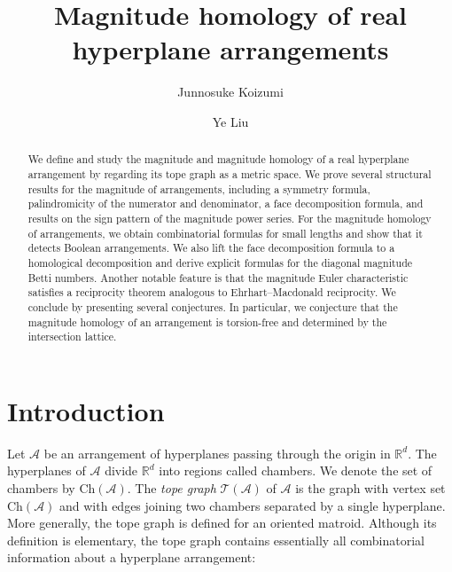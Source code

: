 \documentclass{amsart}
\numberwithin{equation}{section}
\theoremstyle{plain}
\theoremstyle{remark}
\theoremstyle{definition}
\numberwithin{equation}{section}
\newcommand{\A}{\mathcal{A}}
\newcommand{\T}{\mathcal{T}}
\newcommand{\R}{\mathbb{R}}
\newcommand{\Ch}{\mathrm{Ch}}
\begin{document}
\title{Magnitude homology of real hyperplane arrangements}

\author{Junnosuke Koizumi}
\address{RIKEN iTHEMS, Wako, Saitama 351-0198, Japan}


\author{Ye Liu}
\address{Department of Pure Mathematics, Xi'an Jiaotong-Liverpool University, Suzhou, Jiangsu 215123, P. R. China}





\date{}



\begin{abstract}
We define and study the magnitude and magnitude homology of a real hyperplane arrangement by regarding its tope graph as a metric space.
We prove several structural results for the magnitude of arrangements, including a symmetry formula, palindromicity of the numerator and denominator, a face decomposition formula, and results on the sign pattern of the magnitude power series.
For the magnitude homology of arrangements, we obtain combinatorial formulas for small lengths and show that it detects Boolean arrangements.
We also lift the face decomposition formula to a homological decomposition and derive explicit formulas for the diagonal magnitude Betti numbers. Another notable feature is that the magnitude Euler characteristic satisfies a reciprocity theorem analogous to Ehrhart--Macdonald reciprocity. We conclude by presenting several conjectures.
In particular, we conjecture that the magnitude homology of an arrangement is torsion-free and determined by the intersection lattice.
\end{abstract}

\maketitle

\tableofcontents




\section{Introduction}

Let $\A$ be an arrangement of hyperplanes passing through the origin in $\R^d$.
The hyperplanes of $\A$ divide $\R^d$ into regions called chambers.
We denote the set of chambers by $\Ch(\A)$.
The \emph{tope graph} $\T(\A)$ of $\A$ is the graph with vertex set $\Ch(\A)$ and with edges joining two chambers separated by a single hyperplane.
More generally, the tope graph is defined for an oriented matroid.
Although its definition is elementary, the tope graph contains essentially all combinatorial information about a hyperplane arrangement:
\end{document}
